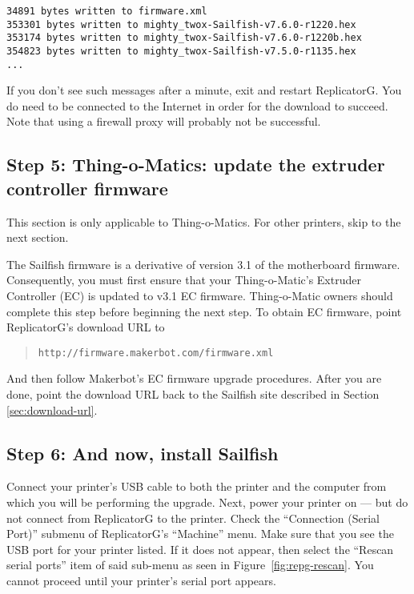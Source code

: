 {\smaller\tt\begin{verbatim}
34891 bytes written to firmware.xml
353301 bytes written to mighty_twox-Sailfish-v7.6.0-r1220.hex
353174 bytes written to mighty_twox-Sailfish-v7.6.0-r1220b.hex
354823 bytes written to mighty_twox-Sailfish-v7.5.0-r1135.hex
...
\end{verbatim}}

If you don't see such messages after a minute, exit and restart ReplicatorG.
You do need to be connected to the Internet in order for the download to
succeed.  Note that using a firewall proxy will probably not be successful.


\subsection{Step 5: Thing-o-Matics: update the extruder controller firmware}

This section is only applicable to Thing-o-Matics.  For other printers,
skip to the next section.

The Sailfish firmware is a derivative of version 3.1 of the motherboard
firmware.  Consequently, you must first ensure that your Thing-o-Matic's
Extruder Controller (EC) is updated to v3.1 EC firmware. Thing-o-Matic owners
should complete this step before beginning the next step.  To obtain
EC firmware, point ReplicatorG's download URL to
\begin{quote}
{\smaller\texttt{http://firmware.makerbot.com/firmware.xml}}
\end{quote}
And then follow Makerbot's EC firmware upgrade procedures.  After you are
done, point the download URL back to the Sailfish site described in Section \ref{sec:download-url}.


\subsection{Step 6: And now, install Sailfish} \label{sec:really-install}

Connect your printer's USB cable to both the printer and the computer from
which you will be performing the upgrade.  Next, power your printer on --- but
do not connect from ReplicatorG to the printer. Check the ``Connection (Serial
Port)'' submenu of ReplicatorG's ``Machine'' menu.  Make sure that you see the
USB port for your printer listed. If it does not appear, then select the
``Rescan serial ports'' item of said sub-menu as seen in
Figure~\ref{fig:repg-rescan}. You cannot proceed
until your printer's serial port appears.

